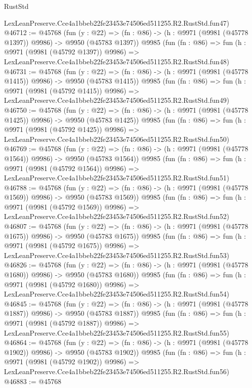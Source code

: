 \begin{lexlean}{RustStd}
\begin{coremodule}
    LexLeanPreserve.Cce4a1bbeb22fe23453e74506ed511255.R2.RustStd.fun47)
@46712 := @45768
    (fun (y : @22) =>
    (fn : @86) -> (h : @9971 (@9981 (@45778 @1397)) @9986) -> @9950 (@45783 @1397))
    @9985
    (fun (fn : @86) =>
    fun (h : @9971 (@9981 (@45792 @1397)) @9986) =>
    LexLeanPreserve.Cce4a1bbeb22fe23453e74506ed511255.R2.RustStd.fun48)
@46731 := @45768
    (fun (y : @22) =>
    (fn : @86) -> (h : @9971 (@9981 (@45778 @1415)) @9986) -> @9950 (@45783 @1415))
    @9985
    (fun (fn : @86) =>
    fun (h : @9971 (@9981 (@45792 @1415)) @9986) =>
    LexLeanPreserve.Cce4a1bbeb22fe23453e74506ed511255.R2.RustStd.fun49)
@46750 := @45768
    (fun (y : @22) =>
    (fn : @86) -> (h : @9971 (@9981 (@45778 @1425)) @9986) -> @9950 (@45783 @1425))
    @9985
    (fun (fn : @86) =>
    fun (h : @9971 (@9981 (@45792 @1425)) @9986) =>
    LexLeanPreserve.Cce4a1bbeb22fe23453e74506ed511255.R2.RustStd.fun50)
@46769 := @45768
    (fun (y : @22) =>
    (fn : @86) -> (h : @9971 (@9981 (@45778 @1564)) @9986) -> @9950 (@45783 @1564))
    @9985
    (fun (fn : @86) =>
    fun (h : @9971 (@9981 (@45792 @1564)) @9986) =>
    LexLeanPreserve.Cce4a1bbeb22fe23453e74506ed511255.R2.RustStd.fun51)
@46788 := @45768
    (fun (y : @22) =>
    (fn : @86) -> (h : @9971 (@9981 (@45778 @1569)) @9986) -> @9950 (@45783 @1569))
    @9985
    (fun (fn : @86) =>
    fun (h : @9971 (@9981 (@45792 @1569)) @9986) =>
    LexLeanPreserve.Cce4a1bbeb22fe23453e74506ed511255.R2.RustStd.fun52)
@46807 := @45768
    (fun (y : @22) =>
    (fn : @86) -> (h : @9971 (@9981 (@45778 @1675)) @9986) -> @9950 (@45783 @1675))
    @9985
    (fun (fn : @86) =>
    fun (h : @9971 (@9981 (@45792 @1675)) @9986) =>
    LexLeanPreserve.Cce4a1bbeb22fe23453e74506ed511255.R2.RustStd.fun53)
@46826 := @45768
    (fun (y : @22) =>
    (fn : @86) -> (h : @9971 (@9981 (@45778 @1680)) @9986) -> @9950 (@45783 @1680))
    @9985
    (fun (fn : @86) =>
    fun (h : @9971 (@9981 (@45792 @1680)) @9986) =>
    LexLeanPreserve.Cce4a1bbeb22fe23453e74506ed511255.R2.RustStd.fun54)
@46845 := @45768
    (fun (y : @22) =>
    (fn : @86) -> (h : @9971 (@9981 (@45778 @1887)) @9986) -> @9950 (@45783 @1887))
    @9985
    (fun (fn : @86) =>
    fun (h : @9971 (@9981 (@45792 @1887)) @9986) =>
    LexLeanPreserve.Cce4a1bbeb22fe23453e74506ed511255.R2.RustStd.fun55)
@46864 := @45768
    (fun (y : @22) =>
    (fn : @86) -> (h : @9971 (@9981 (@45778 @1902)) @9986) -> @9950 (@45783 @1902))
    @9985
    (fun (fn : @86) =>
    fun (h : @9971 (@9981 (@45792 @1902)) @9986) =>
    LexLeanPreserve.Cce4a1bbeb22fe23453e74506ed511255.R2.RustStd.fun56)
@46883 := @45768

\end{coremodule}
\end{lexlean}

